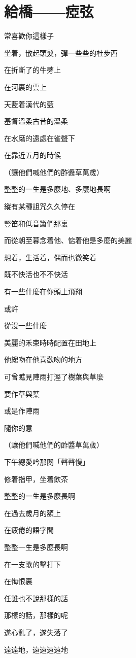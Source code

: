 \section{給橋——瘂弦}

常喜歡你這樣子

坐着，散起頭髮，彈一些些的杜步西

在折斷了的牛蒡上

在河裏的雲上

天藍着漢代的藍

基督溫柔古昔的溫柔

在水磨的遠處在雀聲下

在靠近五月的時候

（讓他們喊他們的酢醬草萬歲）


整整的一生是多麼地、多麼地長啊

縱有某種詛咒久久停在

豎笛和低音簫們那裏

而從朝至暮念着他、惦着他是多麼的美麗



想着，生活着，偶而也微笑着

既不快活也不不快活

有一些什麼在你頭上飛翔

或許

從沒一些什麼



美麗的禾束時時配置在田地上

他總吻在他喜歡吻的地方

可曾瞧見陣雨打溼了樹葉與草麼

要作草與葉

或是作陣雨

隨你的意

（讓他們喊他們的酢醬草萬歲）


下午總愛吟那闋「聲聲慢」

修着指甲，坐着飲茶

整整的一生是多麼長啊

在過去歲月的額上

在疲倦的語字間



整整一生是多麼長啊

在一支歌的擊打下

在悔恨裏



任誰也不說那樣的話

那樣的話，那樣的呢

遂心亂了，遂失落了

遠遠地，遠遠遠遠地